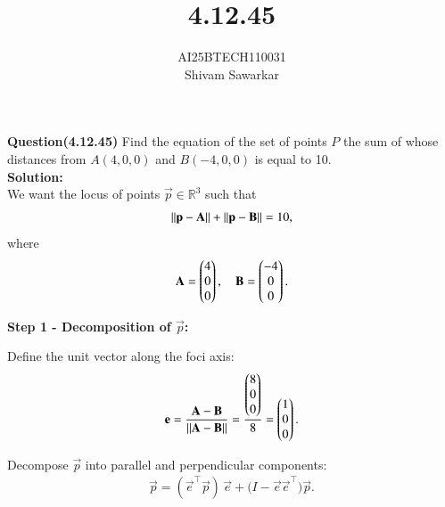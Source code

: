\documentclass[journal]{IEEEtran}
\begin{document}

\vspace{3cm}

\title{4.12.45}
\author{AI25BTECH110031 \\ Shivam Sawarkar}
 \maketitle
{\let\newpage\relax\maketitle}

\renewcommand{\thefigure}{\theenumi}
\renewcommand{\thetable}{\theenumi}
\setlength{\intextsep}{10pt} %


\renewcommand{\thetable}{\theenumi}

\textbf{Question(4.12.45)} Find the equation of the set of points $P$ the sum of whose distances from $A(4, 0, 0)$ and $B(-4, 0, 0)$ is equal to 10. \\ 
\textbf{Solution:} \\ 
We want the locus of points $\vec{p} \in \mathbb{R}^3$ such that
\begin{align}
\left\lVert\mathbf{p}-\mathbf{A}\right\rVert+\left\lVert\mathbf{p}-\mathbf{B}\right\rVert = 10,
\end{align}
where
\begin{align}
\mathbf{A} = \begin{pmatrix}4 \\ 0 \\ 0\end{pmatrix}, \quad
\mathbf{B} = \begin{pmatrix}-4 \\ 0 \\ 0\end{pmatrix}.
\end{align}

\textbf{Step 1 - Decomposition of $\vec{p}$:}

Define the unit vector along the foci axis:
\begin{align}
\mathbf{e} = \frac{\mathbf{A} - \mathbf{B}}{\left\lVert\mathbf{A}-\mathbf{B}\right\rVert}
= \frac{\begin{pmatrix}8 \\ 0 \\ 0\end{pmatrix}}{8} = \begin{pmatrix}1 \\ 0 \\ 0\end{pmatrix}.
\end{align}

Decompose $\vec{p}$ into parallel and perpendicular components:
\begin{align}
\vec{p} = (\vec{e}^\top \vec{p})\,\vec{e}
+ \big( I - \vec{e}\vec{e}^\top \big) \vec{p}.
\end{align}
\end{document}

